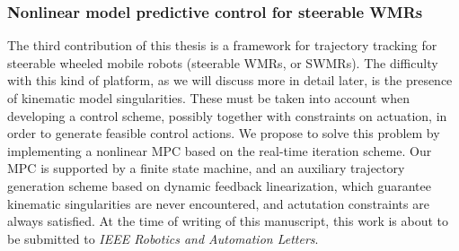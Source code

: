 \subsubsection{Nonlinear model predictive control for steerable WMRs}
The third contribution of this thesis is a framework for trajectory tracking 
for steerable wheeled mobile robots (steerable WMRs, or SWMRs).
The difficulty with this kind of platform,
as we will discuss more in detail later, is the presence of kinematic model 
singularities. These must be taken into account when developing a control 
scheme, possibly together with constraints on actuation, in order to generate
feasible control actions. We propose to solve this problem by implementing a 
nonlinear MPC based on the real-time iteration scheme. Our MPC is supported by a 
finite state machine, and an auxiliary trajectory generation scheme based 
on dynamic feedback linearization, which guarantee kinematic singularities 
are never encountered, and actutation constraints are always satisfied.
At the time of writing of this manuscript, this work is about to be 
submitted to \textit{IEEE Robotics and Automation Letters}.

